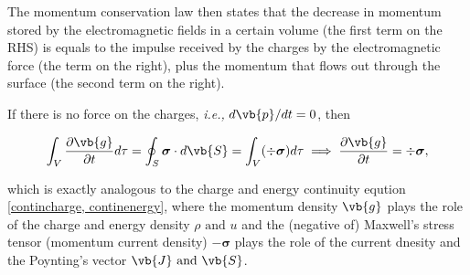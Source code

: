 \documentclass[english,a4paper,12pt]{report}
\begin{document}
The momentum conservation law then states that the decrease in momentum stored by the electromagnetic fields in a certain volume (the first term on the RHS) is equals to the impulse received by the charges by the electromagnetic force (the term on the right), plus the momentum that flows out through the surface (the second term on the right).

If there is no force on the charges, \textit{i.e.,} \(d\vb{p} /dt = 0\), then 

\begin{equation}
    \int_{V}^{} \frac{\partial \vb{g} }{\partial t} d\tau = \oint_{S} \boldsymbol{\sigma } \cdot d\vb{S} = \int_{V}^{} (\div{\boldsymbol{\sigma } } ) d\tau \implies \frac{\partial \vb{g} }{\partial t} = \div{\boldsymbol{\sigma } },  \label{continmomentum} 
\end{equation}

which is exactly analogous to the charge and energy continuity eqution \cref{contincharge, continenergy}, where the momentum density \(\vb{g} \) plays the role of the charge and energy density \(\rho \text { and } u\) and the (negative of) Maxwell's stress tensor (momentum current density) \(-\boldsymbol{\sigma } \) plays the role of the current dnesity and the Poynting's vector \(\vb{J} \text { and } \vb{S} \).     
\end{document}
